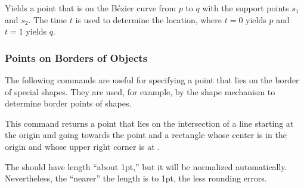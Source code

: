 \begin{command}{\pgfpointcurveattime{}}
  Yields a point that is on the Bézier curve from $p$ to $q$ with the
  support points $s_1$ and $s_2$. The time $t$ is used to determine
  the location, where $t=0$ yields $p$ and $t=1$ yields $q$.

\begin{codeexample}[]
\end{codeexample}
\end{command}

\subsubsection{Points on Borders of Objects}

The following commands are useful for specifying a point that lies on
the border of special shapes. They are used, for example, by the shape
mechanism to determine border points of shapes.

\begin{command}{\pgfpointborderrectangle{}}
  This command returns a point that lies on the intersection of a line
  starting at the origin and going towards the point  and a rectangle whose center is in the origin and whose
  upper right corner is at .

  The  should have length ``about 1pt,'' but it
  will be normalized automatically. Nevertheless, the ``nearer'' the
  length is to 1pt, the less rounding errors.

\begin{codeexample}[]
\end{codeexample}
\end{command}


